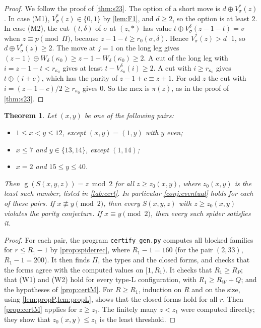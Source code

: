 \documentclass[11pt]{amsart}
\newtheorem{theorem}{Theorem}[section]
\theoremstyle{definition}
\theoremstyle{remark}
\newcommand{\gv}{\operatorname{g}}           %
\newcommand{\Sp}{S}
\newcommand{\free}{\ast}
\begin{document}
\begin{proof}
We follow the proof of \cref{thm:s23}. The option of a short move is $d\oplus V^\free_\sigma(z)$. In case (M1), $V^\free_\sigma(z)\in\{0,1\}$ by \cref{lem:F1}, and $d\ge2$, so the option is at least $2$. In case (M2), the cut $(t,\delta)$ of $\sigma$ at $(z,\free)$ has value $t\oplus V^\delta_\sigma(z-1-t)=v$ when $z\equiv p\pmod\Pi$, because $z-1-t\ge r_0(\sigma,\delta)$. Hence $V^\free_\sigma(z)>d\,|\,1$, so $d\oplus V^\free_\sigma(z)\ge2$. The move at $j=1$ on the long leg gives $(z-1)\oplus W_\delta(\kappa_0)\ge z-1-W_\delta(\kappa_0)\ge2$. A cut of the long leg with $i=z-1-t<r_{\kappa_0}$ gives at least $t-V^\delta_{\kappa_0}(i)\ge2$. A cut with $i\ge r_{\kappa_0}$ gives $t\oplus(i+c)$, which has the parity of $z-1+c\equiv z+1$. For odd $z$ the cut with $i=(z-1-c)/2\ge r_{\kappa_0}$ gives $0$. So the mex is $\pi(z)$, as in the proof of \cref{thm:s23}.
\end{proof}

\begin{theorem}\label{thm:cert}
Let $(x,y)$ be one of the following pairs:
\begin{itemize}[leftmargin=*]
\item $1\le x<y\le 12$, except $(x,y)=(1,y)$ with $y$ even;
\item $x\le 7$ and $y\in\{13,14\}$, except $(1,14)$;
\item $x=2$ and $15\le y\le 40$.
\end{itemize}
Then $\gv(\Sp(x,y,z))=z\bmod2$ for all $z\ge z_0(x,y)$, where $z_0(x,y)$ is the least such number, listed in \cref{tab:cert}. In particular \cref{conj:eventual} holds for each of these pairs. If $x\not\equiv y\pmod 2$, then every $\Sp(x,y,z)$ with $z\ge z_0(x,y)$ violates the parity conjecture. If $x\equiv y\pmod2$, then every such spider satisfies it.
\end{theorem}

\begin{proof}
For each pair, the program \texttt{certify\_gen.py} computes all blocked families for $r\le R_1-1$ by \cref{prop:spiderrec}, where $R_1-1=160$ (for the pair $(2,33)$, $R_1-1=200$). It then finds $\Pi$, the types and the closed forms, and checks that the forms agree with the computed values on $[1,R_1)$. It checks that $R_1\ge R_P$; that (W1) and (W2) hold for every type-L configuration, with $R_1\ge R_W+Q$; and the hypotheses of \cref{prop:certM}. For $R\ge R_1$, induction on $R$ and on the size, using \cref{lem:propP,lem:propL}, shows that the closed forms hold for all $r$. Then \cref{prop:certM} applies for $z\ge z_1$. The finitely many $z<z_1$ were computed directly; they show that $z_0(x,y)\le z_1$ is the least threshold.
\end{proof}
\end{document}
